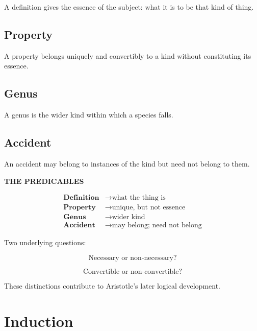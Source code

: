 \documentclass[11pt]{article}
\begin{document}
A definition gives the essence of the subject: what it is to be
that kind of thing.

\subsection{Property}

A property belongs uniquely and convertibly to a kind without
constituting its essence.

\subsection{Genus}

A genus is the wider kind within which a species falls.

\subsection{Accident}

An accident may belong to instances of the kind but need not
belong to them.

\begin{whiteboard}
\textbf{THE PREDICABLES}

\[
\begin{array}{rl}
\textbf{Definition} & \rightarrow \text{what the thing is}\\[0.3em]
\textbf{Property} & \rightarrow \text{unique, but not essence}\\[0.3em]
\textbf{Genus} & \rightarrow \text{wider kind}\\[0.3em]
\textbf{Accident} & \rightarrow \text{may belong; need not belong}
\end{array}
\]

\vspace{0.5em}

Two underlying questions:

\[
\boxed{\text{Necessary or non-necessary?}}
\]

\[
\boxed{\text{Convertible or non-convertible?}}
\]
\end{whiteboard}

These distinctions contribute to Aristotle's later logical
development.

\section{Induction}
\end{document}
